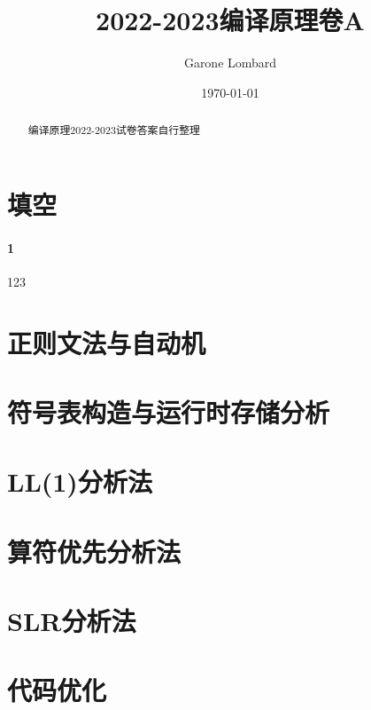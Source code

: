 \documentclass[UTF8]{ctexart} %
\title{2022-2023编译原理卷A}
\author{Garone Lombard}
\date{\today}
\begin{document}
\maketitle %

\newpage

\begin{abstract}
    编译原理2022-2023试卷答案自行整理
\end{abstract}

\newpage

\tableofcontents

\newpage

\section{填空}

\paragraph{1} 123

\section{正则文法与自动机}

\section{符号表构造与运行时存储分析}

\section{LL(1)分析法}

\section{算符优先分析法}

\section{SLR分析法}

\section{代码优化}
\end{document}
